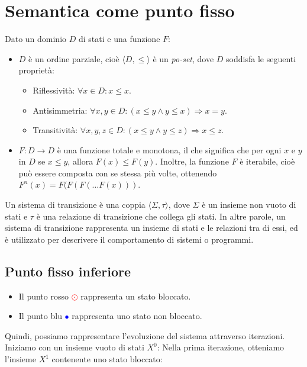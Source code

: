 \section{Semantica come punto fisso}
\begin{tcolorbox}[title={Semantica a punto fisso}]
  Dato un dominio $D$ di stati e una funzione $F$:
  \begin{itemize}
  \item $D$ è un ordine parziale, cioè $\langle D, \leq \rangle$ è un \textit{po-set}, dove $D$ soddisfa le seguenti proprietà:
  \begin{itemize}
      \item Riflessività: $\forall x \in D: x \leq x$.
      \item Antisimmetria: $\forall x, y \in D: (x \leq y \land y \leq x) \Rightarrow x = y$.
      \item Transitività: $\forall x, y, z \in D: (x \leq y \land y \leq z) \Rightarrow x \leq z$.
  \end{itemize}
  \item $F: D \rightarrow D$ è una funzione totale e monotona, il che significa che per ogni $x$ e $y$ in $D$ se $x \leq y$, allora $F(x) \leq F(y)$. Inoltre, la funzione $F$ è iterabile, cioè può essere composta con se stessa più volte, ottenendo $F^n(x) = F(F(F(\ldots F(x)))$.
  \end{itemize}
  \end{tcolorbox}
  
  Un sistema di transizione è una coppia $\langle \Sigma, \tau \rangle$, dove $\Sigma$ è un insieme non vuoto di stati e $\tau$ è una relazione di transizione che collega gli stati. In altre parole, un sistema di transizione rappresenta un insieme di stati e le relazioni tra di essi, ed è utilizzato per descrivere il comportamento di sistemi o programmi.
\subsection{Punto fisso inferiore}
\begin{itemize}
  \item Il punto rosso \textcolor{red}{$\odot$} rappresenta un stato 
  bloccato.
  \item Il punto blu \textcolor{blue}{$\bullet$} rappresenta uno stato
  non bloccato.
\end{itemize}
Quindi, possiamo rappresentare l'evoluzione del sistema attraverso iterazioni. Iniziamo con un insieme vuoto di stati $X^0$:
Nella prima iterazione, otteniamo l'insieme $X^1$ contenente uno stato bloccato:

